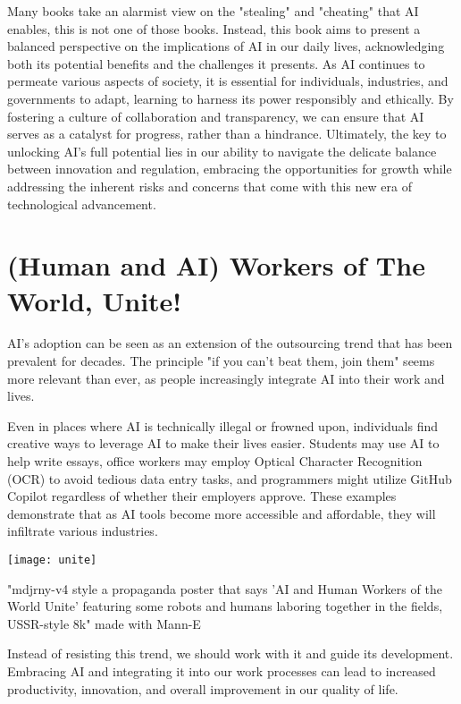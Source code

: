Many books take an alarmist view on the "stealing" and "cheating" that AI enables, this is not one of those books. Instead, this book aims to present a balanced perspective on the implications of AI in our daily lives, acknowledging both its potential benefits and the challenges it presents. As AI continues to permeate various aspects of society, it is essential for individuals, industries, and governments to adapt, learning to harness its power responsibly and ethically. By fostering a culture of collaboration and transparency, we can ensure that AI serves as a catalyst for progress, rather than a hindrance. Ultimately, the key to unlocking AI's full potential lies in our ability to navigate the delicate balance between innovation and regulation, embracing the opportunities for growth while addressing the inherent risks and concerns that come with this new era of technological advancement.

\section{(Human and AI) Workers of The World, Unite!}

AI's adoption can be seen as an extension of the outsourcing trend that has been prevalent for decades. The principle "if you can't beat them, join them" seems more relevant than ever, as people increasingly integrate AI into their work and lives.

Even in places where AI is technically illegal or frowned upon, individuals find creative ways to leverage AI to make their lives easier. Students may use AI to help write essays, office workers may employ Optical Character Recognition (OCR) to avoid tedious data entry tasks, and programmers might utilize GitHub Copilot regardless of whether their employers approve. These examples demonstrate that as AI tools become more accessible and affordable, they will infiltrate various industries.

\begin{marginfigure}[-5.5cm]
    \texttt{[image: unite]}
        \caption{"mdjrny-v4 style a propaganda poster that says 'AI and Human Workers of the World Unite' featuring some robots and humans laboring together in the fields, USSR-style 8k" made with Mann-E}
\end{marginfigure}

Instead of resisting this trend, we should work with it and guide its development. Embracing AI and integrating it into our work processes can lead to increased productivity, innovation, and overall improvement in our quality of life.

